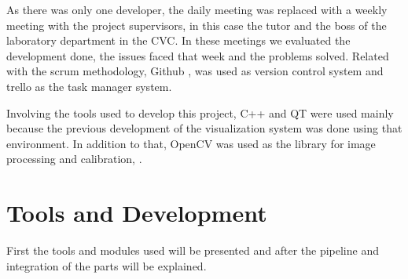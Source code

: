 \documentclass[10pt,a4paper,twocolumn,twoside]{article}
\begin{document}
	As there was only one developer, the daily meeting was replaced with a weekly meeting with the project supervisors, in this case the tutor and the boss of the laboratory department in the CVC. In these meetings we evaluated the development done, the issues faced that week and the problems solved. Related with the scrum methodology, Github \cite{web:github},\cite{web:githubDesktop} was used as version control system and trello\cite{web:trello} as the task manager system.
	
	Involving the tools used to develop this project, C++ and QT \cite{web:qt} were used mainly because the previous development of the visualization system was done using that environment. In addition to that, OpenCV was used as the library for image processing and calibration, \cite{web:opencv}.
	
	
	
	
	
	
	
	
	
	
	\section{Tools and Development}
	
	First the tools and modules used will be presented and after the pipeline and integration of the parts will be explained. 
	
\end{document}
